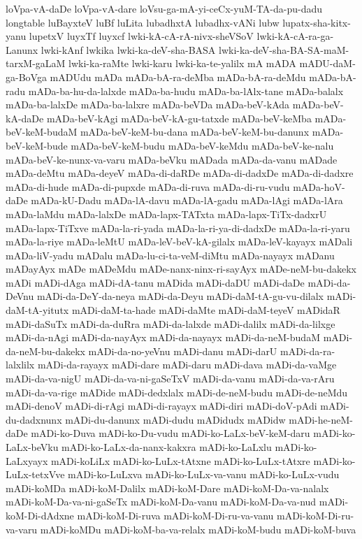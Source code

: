 {loVpa-vA-daDe
loVpa-vA-dare
loVsu-ga-mA-yi-ceCx-yuM-TA-da-pu-dadu
longtable
luBayxteV
luBf
luLita
lubadhxtA
lubadhx-vANi
lubw
lupatx-sha-kitx-yanu
lupetxV
luyxTf
luyxcf
lwki-kA-cA-rA-nivx-sheVSoV
lwki-kA-cA-ra-ga-Lanunx
lwki-kAnf
lwkika
lwki-ka-deV-sha-BASA
lwki-ka-deV-sha-BA-SA-maM-tarxM-gaLaM
lwki-ka-raMte
lwki-karu
lwki-ka-te-yalilx
mA
mADA
mADU-daM-ga-BoVga
mADUdu
mADa
mADa-bA-ra-deMba
mADa-bA-ra-deMdu
mADa-bA-radu
mADa-ba-hu-da-lalxde
mADa-ba-hudu
mADa-ba-lAlx-tane
mADa-balalx
mADa-ba-lalxDe
mADa-ba-lalxre
mADa-beVDa
mADa-beV-kAda
mADa-beV-kA-daDe
mADa-beV-kAgi
mADa-beV-kA-gu-tatxde
mADa-beV-keMba
mADa-beV-keM-budaM
mADa-beV-keM-bu-dana
mADa-beV-keM-bu-danunx
mADa-beV-keM-bude
mADa-beV-keM-budu
mADa-beV-keMdu
mADa-beV-ke-nalu
mADa-beV-ke-nunx-va-varu
mADa-beVku
mADada
mADa-da-vanu
mADade
mADa-deMtu
mADa-deyeV
mADa-di-daRDe
mADa-di-dadxDe
mADa-di-dadxre
mADa-di-hude
mADa-di-pupxde
mADa-di-ruva
mADa-di-ru-vudu
mADa-hoV-daDe
mADa-kU-Dadu
mADa-lA-davu
mADa-lA-gadu
mADa-lAgi
mADa-lAra
mADa-laMdu
mADa-lalxDe
mADa-lapx-TATxta
mADa-lapx-TiTx-dadxrU
mADa-lapx-TiTxve
mADa-la-ri-yada
mADa-la-ri-ya-di-dadxDe
mADa-la-ri-yaru
mADa-la-riye
mADa-leMtU
mADa-leV-beV-kA-gilalx
mADa-leV-kayayx
mADali
mADa-liV-yadu
mADalu
mADa-lu-ci-ta-veM-diMtu
mADa-nayayx
mADanu
mADayAyx
mADe
mADeMdu
mADe-nanx-ninx-ri-sayAyx
mADe-neM-bu-dakekx
mADi
mADi-dAga
mADi-dA-tanu
mADida
mADi-daDU
mADi-daDe
mADi-da-DeVnu
mADi-da-DeY-da-neya
mADi-da-Deyu
mADi-daM-tA-gu-vu-dilalx
mADi-daM-tA-yitutx
mADi-daM-ta-hade
mADi-daMte
mADi-daM-teyeV
mADidaR
mADi-daSuTx
mADi-da-duRra
mADi-da-lalxde
mADi-dalilx
mADi-da-lilxge
mADi-da-nAgi
mADi-da-nayAyx
mADi-da-nayayx
mADi-da-neM-budaM
mADi-da-neM-bu-dakekx
mADi-da-no-yeVnu
mADi-danu
mADi-darU
mADi-da-ra-lalxlilx
mADi-da-rayayx
mADi-dare
mADi-daru
mADi-dava
mADi-da-vaMge
mADi-da-va-nigU
mADi-da-va-ni-gaSeTxV
mADi-da-vanu
mADi-da-va-rAru
mADi-da-va-rige
mADide
mADi-dedxlalx
mADi-de-neM-budu
mADi-de-neMdu
mADi-denoV
mADi-di-rAgi
mADi-di-rayayx
mADi-diri
mADi-doV-pAdi
mADi-du-dadxnunx
mADi-du-danunx
mADi-dudu
mADidudx
mADidw
mADi-he-neM-daDe
mADi-ko-Duva
mADi-ko-Du-vudu
mADi-ko-LaLx-beV-keM-daru
mADi-ko-LaLx-beVku
mADi-ko-LaLx-da-nanx-kakxra
mADi-ko-LaLxlu
mADi-ko-LaLxyayx
mADi-koLiLx
mADi-ko-LuLx-tAtxne
mADi-ko-LuLx-tAtxre
mADi-ko-LuLx-tetxVve
mADi-ko-LuLxva
mADi-ko-LuLx-va-vanu
mADi-ko-LuLx-vudu
mADi-koMDa
mADi-koM-Dalilx
mADi-koM-Dare
mADi-koM-Da-va-nalalx
mADi-koM-Da-va-ni-gaSeTx
mADi-koM-Da-vanu
mADi-koM-Da-va-nud
mADi-koM-Di-dAdxne
mADi-koM-Di-ruva
mADi-koM-Di-ru-va-vanu
mADi-koM-Di-ru-va-varu
mADi-koMDu
mADi-koM-ba-va-relalx
mADi-koM-budu
mADi-koM-buva
}

